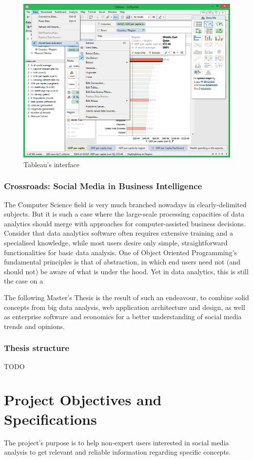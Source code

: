 \documentclass[12pt,a4paper,twoside]{report}
\begin{document}
\begin{figure}[ht]
    \centering
\includegraphics[width=0.8\columnwidth]{img/Tableau-Desktop_3.png}
    \caption{Tableau's interface}
    \label{fig:tableau}
\end{figure}

\subsection{Crossroads: Social Media in Business Intelligence}

The Computer Science field is very much branched nowadays in clearly-delimited subjects. But it is such a case where the large-scale processing capacities of data analytics should merge with approaches for computer-assisted business decisions. Consider that data analytics software often requires extensive training and a specialised knowledge, while most users desire only simple, straightforward functionalities for basic data analysis. One of Object Oriented Programming's fundamental principles is that of abstraction, in which end users need not (and should not) be aware of what is under the hood. Yet in data analytics, this is still the case on a 

The following Master's Thesis is the result of such an endeavour, to combine solid concepts from big data analysis, web application architecture and design, as well as enterprise software and economics for a better understanding of social media trends and opinions.

\subsection*{Thesis structure}
{\color{red} TODO
}

\chapter{Project Objectives and Specifications}
The project's purpose is to help non-expert users interested in social media analysis to get relevant and reliable information regarding specific concepts. 
\end{document}
